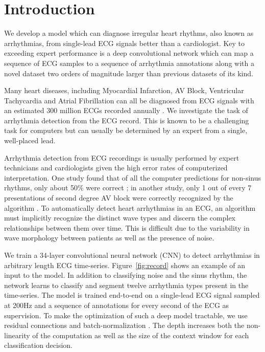 \section{Introduction}
\label{sec:arrhythmia:intro}

We develop a model which can diagnose irregular heart rhythms, also known as
arrhythmias, from single-lead ECG signals better than a cardiologist. Key to
exceeding expert performance is a deep convolutional network which can map a
sequence of ECG samples to a sequence of arrhythmia annotations along with a
novel dataset two orders of magnitude larger than previous datasets of its
kind.

Many heart diseases, including Myocardial Infarction, AV Block, Ventricular
Tachycardia and Atrial Fibrillation can all be diagnosed from ECG signals with
an estimated 300 million ECGs recorded annually \cite{heden1996detection}. We
investigate the task of arrhythmia detection from the ECG record. This is known
to be a challenging task for computers but can usually be determined by an
expert from a single, well-placed lead.

Arrhythmia detection from ECG recordings is usually performed by expert
technicians and cardiologists given the high error rates of computerized
interpretation.  One study found that of all the computer predictions for
non-sinus rhythms, only about 50\% were correct \cite{shah2007errors}; in
another study, only 1 out of every 7 presentations of second degree AV block
were correctly recognized by the algorithm \cite{guglin2006common}. To
automatically detect heart arrhythmias in an ECG, an algorithm must implicitly
recognize the distinct wave types and discern the complex relationships between
them over time. This is difficult due to the variability in wave morphology
between patients as well as the presence of noise.

We train a 34-layer convolutional neural network (CNN) to detect arrhythmias in
arbitrary length ECG time-series. Figure~\ref{fig:record} shows an example of
an input to the model. In addition to classifying noise and the sinus rhythm,
the network learns to classify and segment twelve arrhythmia types present in
the time-series. The model is trained end-to-end on a single-lead ECG signal
sampled at 200Hz and a sequence of annotations for every second of the ECG as
supervision. To make the optimization of such a deep model tractable, we use
residual connections and batch-normalization \cite{he2016deep, ioffe2015batch}.
The depth increases both the non-linearity of the computation as well as the
size of the context window for each classification decision.

